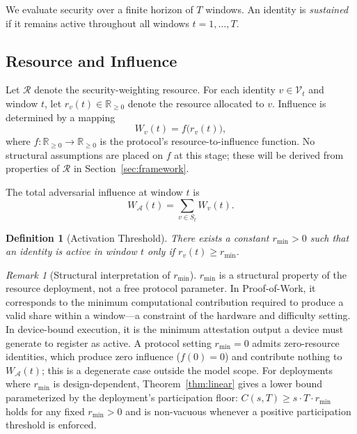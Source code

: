 \documentclass[10pt,journal,compsoc]{IEEEtran}
\newtheorem{definition}[theorem]{Definition}
\theoremstyle{remark}
\newtheorem{remark}{Remark}[section]
\begin{document}
	We evaluate security over a finite horizon of $T$
	windows.
	An identity is \emph{sustained} if it remains active
	throughout all windows $t = 1, \ldots, T$.
	
	\subsection{Resource and Influence}
	\label{ssec:resource}
	
	Let $\mathcal{R}$ denote the security-weighting resource.
	For each identity $v \in \mathcal{V}_t$ and window $t$,
	let $r_v(t) \in \mathbb{R}_{\geq 0}$ denote the
	resource allocated to $v$.
	Influence is determined by a mapping
	\begin{equation}
		W_v(t) = f\bigl(r_v(t)\bigr),
	\end{equation}
	where $f : \mathbb{R}_{\geq 0} \to \mathbb{R}_{\geq 0}$
	is the protocol's resource-to-influence function.
	No structural assumptions are placed on $f$ at this
	stage; these will be derived from properties of
	$\mathcal{R}$ in Section~\ref{sec:framework}.
	
	The total adversarial influence at window $t$ is
	\begin{equation}
		W_{\mathcal{A}}(t) = \sum_{v \in S_t} W_v(t).
	\end{equation}
	
	\begin{definition}[Activation Threshold]
		\label{def:threshold}
		There exists a constant $r_{\min} > 0$ such that
		an identity is active in window $t$ only if
		$r_v(t) \geq r_{\min}$.
	\end{definition}
	
	\begin{remark}[Structural interpretation of $r_{\min}$]
		\label{rem:rmin}
		$r_{\min}$ is a structural property of the resource
		deployment, not a free protocol parameter.
		In Proof-of-Work, it corresponds to the minimum
		computational contribution required to produce a valid
		share within a window---a constraint of the hardware
		and difficulty setting.
		In device-bound execution, it is the minimum attestation
		output a device must generate to register as active.
		A protocol setting $r_{\min} = 0$ admits zero-resource
		identities, which produce zero influence ($f(0) = 0$)
		and contribute nothing to $W_{\mathcal{A}}(t)$; this
		is a degenerate case outside the model scope.
		For deployments where $r_{\min}$ is design-dependent,
		Theorem~\ref{thm:linear} gives a lower bound
		parameterized by the deployment's participation floor:
		$C(s,T) \geq s \cdot T \cdot r_{\min}$ holds for any
		fixed $r_{\min} > 0$ and is non-vacuous whenever a
		positive participation threshold is enforced.
	\end{remark}
	
\end{document}
